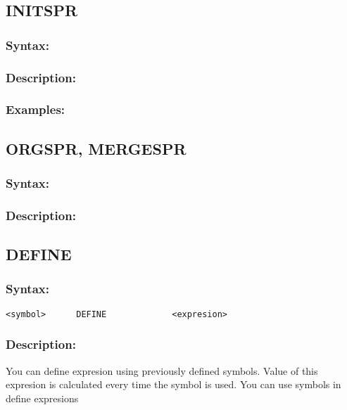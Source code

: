     \subsection{INITSPR}
        \subsubsection{Syntax:}

        \subsubsection{Description:}
 
        \subsubsection{Examples:}


    \subsection{ORGSPR, MERGESPR}
        \subsubsection{Syntax:}

        \subsubsection{Description:}

    \subsection{DEFINE}
        \subsubsection{Syntax:}
            \verb'<symbol>      DEFINE             <expresion>'

        \subsubsection{Description:}
        You can define expresion using previously defined symbols. Value of this expresion is calculated every time the symbol is used. You can use symbols in define expresions

